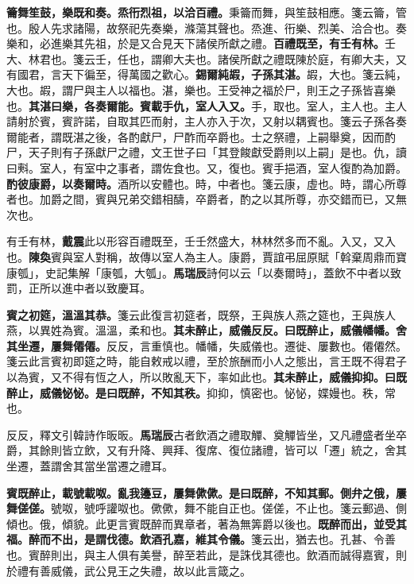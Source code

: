 \textbf{籥舞笙鼓，樂既和奏。烝衎烈祖，以洽百禮。}{\footnotesize 秉籥而舞，與笙鼓相應。箋云籥，管也。殷人先求諸陽，故祭祀先奏樂，滌蕩其聲也。烝進、衎樂、烈美、洽合也。奏樂和，必進樂其先祖，於是又合見天下諸侯所獻之禮。}\textbf{百禮既至，有壬有林。}{\footnotesize 壬大、林君也。箋云壬，任也，謂卿大夫也。諸侯所獻之禮既陳於庭，有卿大夫，又有國君，言天下徧至，得萬國之歡心。}\textbf{錫爾純嘏，子孫其湛。}{\footnotesize 嘏，大也。箋云純，大也。嘏，謂尸與主人以福也。湛，樂也。王受神之福於尸，則王之子孫皆喜樂也。}\textbf{其湛曰樂，各奏爾能。賓載手仇，室人入又。}{\footnotesize 手，取也。室人，主人也。主人請射於賓，賓許諾，自取其匹而射，主人亦入于次，又射以耦賓也。箋云子孫各奏爾能者，謂既湛之後，各酌獻尸，尸酢而卒爵也。士之祭禮，上嗣舉奠，因而酌尸，天子則有子孫獻尸之禮，文王世子曰「其登餕獻受爵則以上嗣」是也。仇，讀曰㪺。室人，有室中之事者，謂佐食也。又，復也。賓手挹酒，室人復酌為加爵。}\textbf{酌彼康爵，以奏爾時。}{\footnotesize 酒所以安體也。時，中者也。箋云康，虛也。時，謂心所尊者也。加爵之間，賓與兄弟交錯相醻，卒爵者，酌之以其所尊，亦交錯而已，又無次也。}

\begin{quoting}有壬有林，\textbf{戴震}此以形容百禮既至，壬壬然盛大，林林然多而不亂。入又，又入也。\textbf{陳奐}賓與室人對稱，故傳以室人為主人。康爵，賈誼弔屈原賦「斡棄周鼎而寶康瓠」，史記集解「康瓠，大瓠」。\textbf{馬瑞辰}詩何以云「以奏爾時」，蓋飲不中者以致罰，正所以進中者以致慶耳。\end{quoting}

\textbf{賓之初筵，溫溫其恭。}{\footnotesize 箋云此復言初筵者，既祭，王與族人燕之筵也，王與族人燕，以異姓為賓。溫溫，柔和也。}\textbf{其未醉止，威儀反反。曰既醉止，威儀幡幡。舍其坐遷，屢舞僊僊。}{\footnotesize 反反，言重慎也。幡幡，失威儀也。遷徙、屢數也。僊僊然。箋云此言賓初即筵之時，能自敕戒以禮，至於旅酬而小人之態出，言王既不得君子以為賓，又不得有恆之人，所以敗亂天下，率如此也。}\textbf{其未醉止，威儀抑抑。曰既醉止，威儀怭怭。是曰既醉，不知其秩。}{\footnotesize 抑抑，慎密也。怭怭，媟嫚也。秩，常也。}

\begin{quoting}反反，釋文引韓詩作昄昄。\textbf{馬瑞辰}古者飲酒之禮取觶、奠觶皆坐，又凡禮盛者坐卒爵，其餘則皆立飲，又有升降、興拜、復席、復位諸禮，皆可以「遷」統之，舍其坐遷，蓋謂舍其當坐當遷之禮耳。\end{quoting}

\textbf{賓既醉止，載號載呶。亂我籩豆，屢舞僛僛。是曰既醉，不知其郵。側弁之俄，屢舞傞傞。}{\footnotesize 號呶，號呼讙呶也。僛僛，舞不能自正也。傞傞，不止也。箋云郵過、側傾也。俄，傾貌。此更言賓既醉而異章者，著為無筭爵以後也。}\textbf{既醉而出，並受其福。醉而不出，是謂伐德。飲酒孔嘉，維其令儀。}{\footnotesize 箋云出，猶去也。孔甚、令善也。賓醉則出，與主人俱有美譽，醉至若此，是誅伐其德也。飲酒而誠得嘉賓，則於禮有善威儀，武公見王之失禮，故以此言箴之。}

